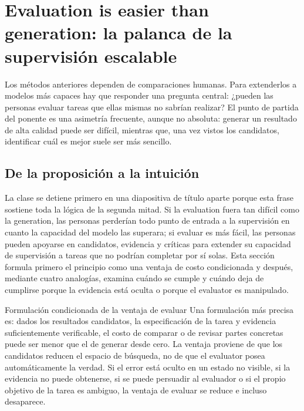 \section{Evaluation is easier than generation: la palanca de la supervisión escalable}

Los métodos anteriores dependen de comparaciones humanas. Para extenderlos a modelos más capaces hay que responder una pregunta central: ¿pueden las personas evaluar tareas que ellas mismas no sabrían realizar? El punto de partida del ponente es una asimetría frecuente, aunque no absoluta: generar un resultado de alta calidad puede ser difícil, mientras que, una vez vistos los candidatos, identificar cuál es mejor suele ser más sencillo.

\subsection{De la proposición a la intuición}

La clase se detiene primero en una diapositiva de título aparte porque esta frase sostiene toda la lógica de la segunda mitad. Si la evaluation fuera tan difícil como la generation, las personas perderían todo punto de entrada a la supervisión en cuanto la capacidad del modelo las superara; si evaluar es más fácil, las personas pueden apoyarse en candidatos, evidencia y críticas para extender su capacidad de supervisión a tareas que no podrían completar por sí solas. Esta sección formula primero el principio como una ventaja de costo condicionada y después, mediante cuatro analogías, examina cuándo se cumple y cuándo deja de cumplirse porque la evidencia está oculta o porque el evaluator es manipulado.


\begin{importantbox}{Formulación condicionada de la ventaja de evaluar}
Una formulación más precisa es: dados los resultados candidatos, la especificación de la tarea y evidencia suficientemente verificable, el costo de comparar o de revisar partes concretas puede ser menor que el de generar desde cero. La ventaja proviene de que los candidatos reducen el espacio de búsqueda, no de que el evaluator posea automáticamente la verdad. Si el error está oculto en un estado no visible, si la evidencia no puede obtenerse, si se puede persuadir al evaluador o si el propio objetivo de la tarea es ambiguo, la ventaja de evaluar se reduce e incluso desaparece.
\end{importantbox}

